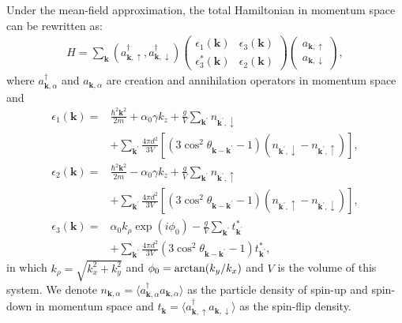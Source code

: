 \documentclass[twocolumn,english,pra,superscriptaddress]{revtex4-1}
\begin{document}
Under the mean-field approximation, the total Hamiltonian in momentum space can be rewritten as:
\begin{align}
H=\sum_{\mathbf{k}}(a_{\mathbf{k},\uparrow}^{\dagger},a_{\mathbf{k},\downarrow}^{\dagger})\begin{pmatrix}
\epsilon_{1}(\mathbf{k})&\epsilon_{3}(\mathbf{k})\\
\epsilon_{3}^{*}(\mathbf{k})&\epsilon_{2}(\mathbf{k})
\end{pmatrix}
\begin{pmatrix}
a_{\mathbf{k},\uparrow}\\a_{\mathbf{k},\downarrow}
\end{pmatrix},
\end{align}
where $a_{\mathbf{k},\alpha}^{\dagger}$ and $a_{\mathbf{k},\alpha}$ are creation and annihilation operators in momentum space and
\begin{subequations}
\begin{align}
\epsilon_{1}(\mathbf{k})=&\frac{\hbar^{2}\mathbf{k}^{2}}{2m}+\alpha_{0} \gamma k_{z}+\frac{g}{V}\sum_{\mathbf{k}^{'}}n_{\mathbf{k}^{'},\downarrow}
\nonumber \\ 
&+\sum_{\mathbf{k^{'}}}\frac{4\pi d^{2}}{3V}\left[\left(3\cos^{2}\theta_{\mathbf{k-k^{'}}}-1\right) \left(n_{\mathbf{k^{'}},\downarrow}-n_{\mathbf{k^{'}},\uparrow}\right)\right],\\
\epsilon_{2}(\mathbf{k})=&\frac{\hbar^{2}\mathbf{k}^{2}}{2m}-\alpha_{0} \gamma k_{z}+\frac{g}{V}\sum_{\mathbf{k}^{'}}n_{\mathbf{k}^{'},\uparrow}\nonumber \\ &+\sum_{\mathbf{k^{'}}}\frac{4\pi d^{2}}{3V}\left[\left(3\cos^{2}\theta_{\mathbf{k-k^{'}}}-1\right)\left(n_{\mathbf{k^{'}},\uparrow}-n_{\mathbf{k^{'}},\downarrow}\right)\right],\\
\epsilon_{3}(\mathbf{k})=&\alpha_{0} k_{\rho}\exp(i\phi_{0})-\frac{g}{V}\sum_{\mathbf{k}^{'}}t_{\mathbf{k}^{'}}^{*}\nonumber \\
&+\sum_{\mathbf{k^{'}}}\frac{4\pi d^{2}}{3V}\left(3\cos^{2}\theta_{\mathbf{k-k^{'}}}-1\right)t_{\mathbf{k^{'}}}^{*},
\end{align}
\end{subequations}
in which $k_{\rho}=\sqrt{k_{x}^{2}+k_{y}^{2}}$ and $\phi_{0}={\rm arctan}(k_{y}/k_{x})$ and $V$ is the volume of this system. We denote $n_{\mathbf{k},\alpha}=\langle a_{\mathbf{k},\alpha}^{\dagger} a_{\mathbf{k},\alpha}\rangle$ as the particle density of spin-up and spin-down in momentum space and $t_{\mathbf{k}}=\langle  a_{\mathbf{k},\uparrow}^{\dagger}a_{\mathbf{k},\downarrow} \rangle$ as the spin-flip density.\par
\end{document}
